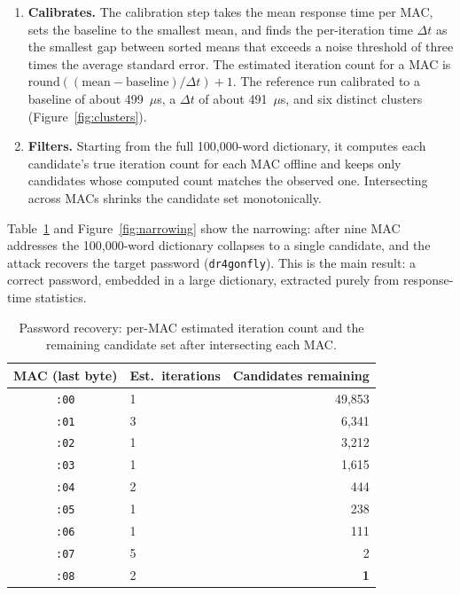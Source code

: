 \documentclass[11pt,letterpaper]{article}
\newcommand{\code}[1]{\texttt{\small #1}}
\begin{document}
\begin{enumerate}
  \item \textbf{Calibrates.} The calibration step takes the mean response time
    per MAC, sets the baseline to the smallest mean, and finds the per-iteration
    time $\Delta t$ as the smallest gap between sorted means that exceeds a noise
    threshold of three times the average standard error. The estimated iteration
    count for a MAC is $\mathrm{round}((\mathrm{mean} - \mathrm{baseline}) /
    \Delta t) + 1$. The reference run calibrated to a baseline of about
    499~$\mu$s, a $\Delta t$ of about 491~$\mu$s, and six distinct clusters
    (Figure~\ref{fig:clusters}).
  \item \textbf{Filters.} Starting from the full 100,000-word dictionary, it
    computes each candidate's true iteration count for each MAC offline and keeps
    only candidates whose computed count matches the observed one. Intersecting
    across MACs shrinks the candidate set monotonically.
\end{enumerate}

Table~\ref{tab:recovery} and Figure~\ref{fig:narrowing} show the narrowing:
after nine MAC addresses the 100,000-word dictionary collapses to a single
candidate, and the attack recovers the target password (\code{dr4gonfly}). This
is the main result: a correct password, embedded in a large dictionary,
extracted purely from response-time statistics.

\begin{table}[ht]
  \centering
  \caption{Password recovery: per-MAC estimated iteration count and the
  remaining candidate set after intersecting each MAC.}
  \label{tab:recovery}
  \begin{tabular}{clr}
    \toprule
    MAC (last byte) & Est.\ iterations & Candidates remaining \\
    \midrule
    \code{:00} & 1 & 49,853 \\
    \code{:01} & 3 & 6,341 \\
    \code{:02} & 1 & 3,212 \\
    \code{:03} & 1 & 1,615 \\
    \code{:04} & 2 & 444 \\
    \code{:05} & 1 & 238 \\
    \code{:06} & 1 & 111 \\
    \code{:07} & 5 & 2 \\
    \code{:08} & 2 & \textbf{1} \\
    \bottomrule
  \end{tabular}
\end{table}
\end{document}
